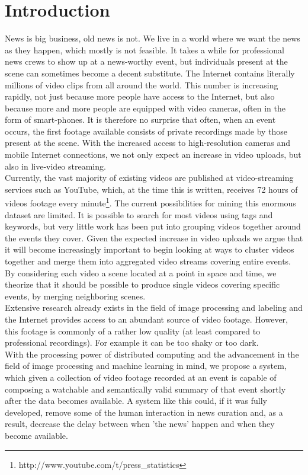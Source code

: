 %
\chapter{Introduction}
%
News is big business, old news is not. We live in a world where we want the news as they happen, which mostly is not feasible. It takes a while for professional news crews to show up at a news-worthy event, but individuals present at the scene can sometimes become a decent substitute. The Internet contains literally millions of video clips from all around the world. This number is increasing rapidly, not just because more people have access to the Internet, but also because more and more people are equipped with video cameras, often in the form of smart-phones. It is therefore no surprise that often, when an event occurs, the first footage available consists of private recordings made by those present at the scene. With the increased access to high-resolution cameras and mobile Internet connections, we not only expect an increase in video uploads, but also in live-video streaming.\\
Currently, the vast majority of existing videos are published at video-streaming services such as YouTube, which, at the time this is written, receives 72 hours of videos footage every minute\footnote{http://www.youtube.com/t/press\_statistics}. The current possibilities for mining this enormous dataset are limited. It is possible to search for most videos using tags and keywords, but very little work has been put into grouping videos together around the events they cover. Given the expected increase in video uploads we argue that it will become increasingly important to begin looking at ways to cluster videos together and merge them into aggregated video streams covering entire events. By considering each video a scene located at a point in space and time, we theorize that it should be possible to produce single videos covering specific events, by merging neighboring scenes.\\
Extensive research already exists in the field of image processing and labeling and the Internet provides access to an abundant source of video footage. However, this footage is commonly of a rather low quality (at least compared to professional recordings). For example it can be too shaky or too dark.\\
With the processing power of distributed computing and the advancement in the field of image processing and machine learning in mind, we propose a system, which given a collection of video footage recorded at an event is capable of composing a watchable and semantically valid summary of that event shortly after the data becomes available. A system like this could, if it was fully developed, remove some of the human interaction in news curation and, as a result, decrease the delay between when 'the news' happen and when they become available.
%
